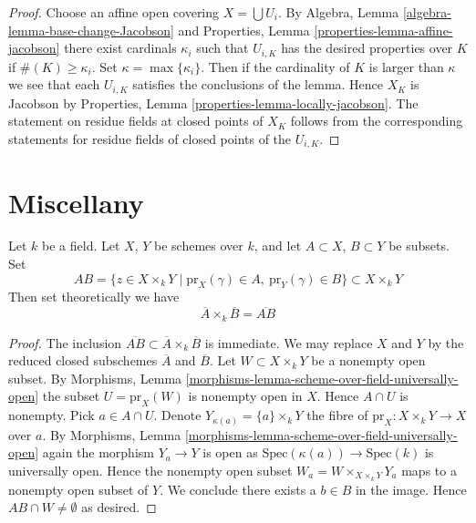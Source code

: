 \begin{proof}
Choose an affine open covering $X = \bigcup U_i$.
By
Algebra, Lemma \ref{algebra-lemma-base-change-Jacobson}
and
Properties, Lemma \ref{properties-lemma-affine-jacobson}
there exist cardinals $\kappa_i$ such that $U_{i, K}$ has
the desired properties over $K$ if $\#(K) \geq \kappa_i$.
Set $\kappa = \max\{\kappa_i\}$. Then if the cardinality of
$K$ is larger than $\kappa$ we see that each $U_{i, K}$ satisfies
the conclusions of the lemma. Hence $X_K$ is Jacobson by
Properties, Lemma \ref{properties-lemma-locally-jacobson}.
The statement on residue fields at closed points of $X_K$
follows from the corresponding
statements for residue fields of closed points of the $U_{i, K}$.
\end{proof}





\section{Miscellany}
\label{section-miscellany}

\begin{lemma}
\label{lemma-closure-of-product}
Let $k$ be a field.
Let $X$, $Y$ be schemes over $k$, and let
$A \subset X$, $B \subset Y$ be subsets.
Set
$$
AB =
\{z \in X \times_k Y \mid
\text{pr}_X(\gamma) \in A,\ \text{pr}_Y(\gamma) \in B\}
\subset X \times_k Y
$$
Then set theoretically we have
$$
\overline{A} \times_k \overline{B} = \overline{AB}
$$
\end{lemma}

\begin{proof}
The inclusion $\overline{AB} \subset \overline{A} \times_k \overline{B}$
is immediate.
We may replace $X$ and $Y$ by the reduced closed subschemes $\overline{A}$
and $\overline{B}$.
Let $W \subset X \times_k Y$ be a nonempty open subset. By
Morphisms, Lemma \ref{morphisms-lemma-scheme-over-field-universally-open}
the subset $U = \text{pr}_X(W)$ is nonempty open in $X$. 
Hence $A \cap U$ is nonempty. Pick $a \in A \cap U$.
Denote $Y_{\kappa(a)} = \{a\} \times_k Y$
the fibre of $\text{pr}_X : X \times_k Y \to X$ over $a$. By
Morphisms, Lemma \ref{morphisms-lemma-scheme-over-field-universally-open}
again the morphism $Y_a \to Y$ is open as
$\text{Spec}(\kappa(a)) \to \text{Spec}(k)$ is universally open.
Hence the nonempty open
subset $W_a = W \times_{X \times_k Y} Y_a$
maps to a nonempty open subset of $Y$.
We conclude there exists a $b \in B$ in the image.
Hence $AB \cap W \not = \emptyset$ as desired.
\end{proof}





